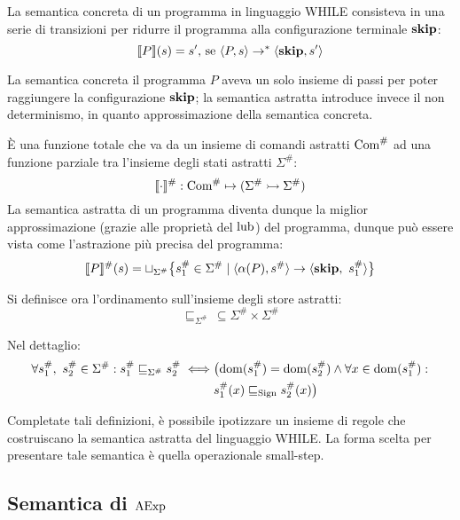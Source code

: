 \begin{definizione}
La semantica concreta di un programma in linguaggio WHILE
consisteva in una serie di transizioni per ridurre il programma
alla configurazione terminale $\mathop{\textup{\textbf{skip}}}$:
\[      
        \llbracket P \rrbracket (s) = s' \text{, se } \langle P, s \rangle \rightarrow^* \langle \mathop{\textup{\textbf{skip}}}, s' \rangle
\]
\end{definizione}
La semantica concreta il programma $P$ aveva un solo insieme di passi
per poter raggiungere la configurazione $\mathop{\textup{\textbf{skip}}}$;
la semantica astratta introduce invece il non determinismo, in quanto
approssimazione della semantica concreta.
\begin{definizione}
È una funzione totale che va da un insieme di comandi astratti $\mathrm{Com}^\#$
ad una funzione parziale tra l'insieme degli stati astratti $\Sigma^\#:$
\[
        \llbracket \cdot \rrbracket^\# : \mathrm{Com}^\# \mapsto (\Sigma^\# \rightarrowtail \Sigma^\#)
\]
La semantica astratta di un programma diventa dunque la miglior
approssimazione (grazie alle proprietà del $\mathop{\mathrm{lub}}\nolimits$) del programma,
dunque può essere vista come l'astrazione più precisa del programma:
\[
        \llbracket P \rrbracket^\# (s) =  \sqcup _{\Sigma^\#} \bigl\{ s^\#_1 \in \Sigma^\# \mid \langle \alpha(P), s^\# \rangle \rightarrow \langle \mathop{\textup{\textbf{skip}}},\ s^\#_1 \rangle \bigr\}
\]
\end{definizione}

\begin{definizione}
Si definisce ora l'ordinamento sull'insieme degli store astratti:
\[
        \sqsubseteq_{\Sigma^\#}\, \subseteq \Sigma^\# \times \Sigma^\#
\]
\end{definizione}
Nel dettaglio:
\begin{align*}
        \forall s_1^\#,\ s_2^\# \in \Sigma^\#
                \mathrel{:} s_1^\# \sqsubseteq_{\Sigma^\#} s_2^\# \iff &\bigl(\mathop{\mathrm{dom}}\nolimits(s_1^\#) = \mathop{\mathrm{dom}}\nolimits(s_2^\#) \land \forall x \in \mathop{\mathrm{dom}}\nolimits(s_1^\#) \mathrel{:} \\
        & s_1^\#(x) \sqsubseteq_{\mathrm{Sign}} s_2^\#(x) \bigr)
\end{align*}

Completate tali definizioni, è possibile ipotizzare un insieme di regole
che costruiscano la semantica astratta del linguaggio WHILE. La forma
scelta per presentare tale semantica è quella operazionale small-step.

\subsection{Semantica di $\mathrm{AExp}$}

